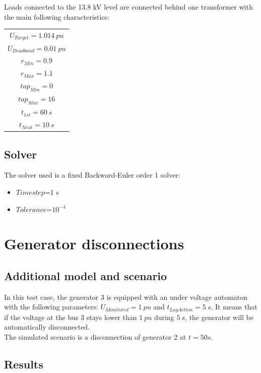 \documentclass[a4paper, 12pt]{report}
\begin{document}
Loads connected to the 13.8 kV level are connected behind one transformer with the main following characteristics:

\begin{center}
\begin{tabular}{c}
   $U_{Target}=1.014 \ pu $  \\
   $U_{Deadband}=0.01 \ pu $ \\
   $r_{Min}=0.9 $ \\
   $r_{Max}=1.1 $ \\
   $tap_{Min}=0 $  \\
   $tap_{Max}=16 $ \\
   $t_{1st}=60 \ s $ \\
   $t_{Next}=10 \ s $  \\
\end{tabular}
\end{center}

\subsection{Solver}
The solver used is a fixed Backward-Euler order 1 solver:
\begin{itemize}
\item $Time step$=1 s
\item $Tolerance$=$10^{-4}$
\end{itemize}

\newpage
\section{Generator disconnections}

\subsection{Additional model and scenario}

In this test case, the generator 3 is equipped with an under voltage automaton with the following parameters: $U_{Monitored} = 1 \ pu $ and $t_{LagAction} = 5 \ s$. It means that if the voltage at the bus 3 stays lower than $1 \ pu$ during $5 \ s$, the generator will be automatically disconnected.\\

The simulated scenario is a disconnection of generator 2 at $ t = 50 s$.

\subsection{Results}
\end{document}
